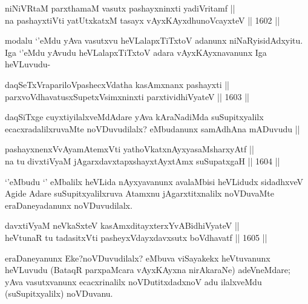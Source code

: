 \begin{shl}
niNiVRtaM parxthamaM vasutx pashayxninxti yadiVritamf || \\
na pashayxtiVti yatUtxkatxM tasayx vAyxKAyx\s dhunoVcayxteV \hfill || 1602 ||  
\end{shl}

\begin{artha}
modalu `\stext'eMdu yAva vasutxvu heVLalapxTiTxtoV adanunx niNaRyisidAdxyitu. Iga `\stext'eMdu yAvudu heVLalapxTiTxtoV adara vAyxKAyxnavanunx Iga heVLuvudu-
\end{artha}

\begin{shl}
daqSeTxVrapariloVpashecxVdatha kasAmxnanx pashayxti || \\
parxvoVdhavatusxSupetxV\s simxninxti parxtividhiVyateV \hfill || 1603 || 
\end{shl}

\begin{artha}
daqSiTxge cuyxtiyilalxveMdAdare yAva kAraNadiMda suSupitxyalilx ecacxradalilxruvaMte noVDuvudilalx? eMbudanunx samAdhAna mADuvudu ||
\end{artha}

\begin{shl}
pashayxnenxVvAyamAtemxVti yathoVkatxnAyxyasaMsharxyAtf ||  \\
na tu divxtiVyaM jAgarxdavxtapxshayxtAyxtAmx suSupatxgaH \hfill || 1604 ||  
\end{shl}

\begin{artha}
`\stext'eMbudu `\stext' eMbalilx heVLida nAyxyavanunx avalaMbisi heVLidudx sidadhxveV Agide Adare suSupitxyalilxruva Atamxnu jAgarxtitxnalilx noVDuvaMte eraDaneyadanunx noVDuvudilalx.
\end{artha}

\begin{shl}
davxtiVyaM neVkaSxteV kasAmxditayxterxYvABidhiVyateV || \\
heVtunaR tu tadasitxVti pasheyxVdayxdavxsutx boVdhavatf \hfill || 1605 ||  
\end{shl}

\begin{artha}
eraDaneyanunx Eke?noVDuvudilalx? eMbuva viSayakekx heVtuvanunx heVLuvudu (BataqR parxpaMcara vAyxKAyxna nirAkaraNe) adeVneMdare; yAva vasutxvanunx ecacxrinalilx noVDutitxdadxnoV adu ilalxveMdu (suSupitxyalilx) noVDuvanu.
\end{artha}


